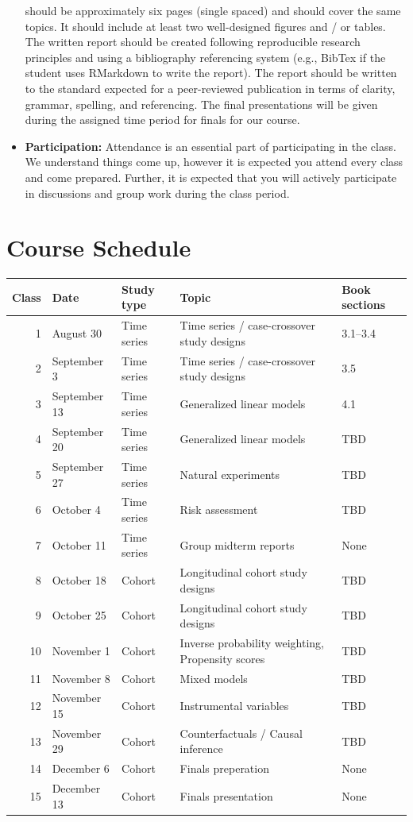 \documentclass[
]{book}
\begin{document}
\begin{itemize}
  should be approximately six pages (single spaced) and should cover the
  same topics. It should include at least two well-designed figures and / or
  tables. The written report should be created following reproducible
  research principles and using a bibliography referencing system (e.g.,
  BibTex if the student uses RMarkdown to write the report). The report
  should be written to the standard expected for a peer-reviewed
  publication in terms of clarity, grammar, spelling, and referencing.
  The final presentations will be given during the assigned time period
  for finals for our course.
\item
  \textbf{Participation:} Attendance is an essential part of participating
  in the class. We understand things come up, however it is expected you
  attend every class and come prepared. Further, it is expected that you will
  actively participate in discussions and group work during the class period.
\end{itemize}

\hypertarget{course-schedule}{%
\section{Course Schedule}\label{course-schedule}}

\begin{tabular}{r|l|l|l|l}
\hline
Class & Date & Study type & Topic & Book sections\\
\hline
1 & August 30 & Time series & Time series / case-crossover study designs & 3.1--3.4\\
\hline
2 & September 3 & Time series & Time series / case-crossover study designs & 3.5\\
\hline
3 & September 13 & Time series & Generalized linear models & 4.1\\
\hline
4 & September 20 & Time series & Generalized linear models & TBD\\
\hline
5 & September 27 & Time series & Natural experiments & TBD\\
\hline
6 & October 4 & Time series & Risk assessment & TBD\\
\hline
7 & October 11 & Time series & Group midterm reports & None\\
\hline
8 & October 18 & Cohort & Longitudinal cohort study designs & TBD\\
\hline
9 & October 25 & Cohort & Longitudinal cohort study designs & TBD\\
\hline
10 & November 1 & Cohort & Inverse probability weighting, Propensity scores & TBD\\
\hline
11 & November 8 & Cohort & Mixed models & TBD\\
\hline
12 & November 15 & Cohort & Instrumental variables & TBD\\
\hline
13 & November 29 & Cohort & Counterfactuals / Causal inference & TBD\\
\hline
14 & December 6 & Cohort & Finals preperation & None\\
\hline
15 & December 13 & Cohort & Finals presentation & None\\
\hline
\end{tabular}
\end{document}
